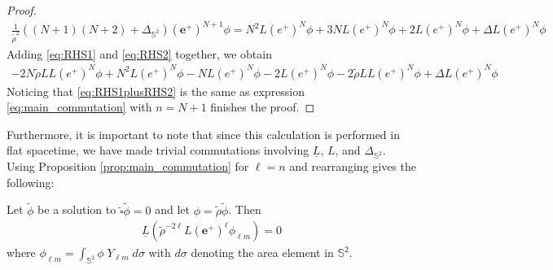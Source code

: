 \begin{proof}
\begin{align}\label{eq:RHS2}
  \frac{1}{\tilde{\rho}^2}((N+1)(N+2) + \Delta_{\mathbb{S}^2})(\boldsymbol{e}^+)^{N+1} \phi = N^{2} L\left(e^{+}\right)^{N} \phi+3 N L\left(e^{+}\right)^{N} \phi+2 L\left(e^{+}\right)^{N} \phi+\Delta L\left(e^{+}\right)^{N} \phi
\end{align}
Adding \eqref{eq:RHS1} and \eqref{eq:RHS2} together, we obtain
\begin{align}\label{eq:RHS1plusRHS2}
  -2 N \tilde{\rho} L L\left(e^{+}\right)^{N} \phi+N^{2} L\left(e^{+}\right)^{N} \phi-N L\left(e^{+}\right)^{N} \phi-2 L\left(e^{+}\right)^{N} \phi - 2 \tilde{\rho} L L\left(e^{+}\right)^{N} \phi+\Delta L\left(e^{+}\right)^{N} \phi
\end{align}
Noticing that \eqref{eq:RHS1plusRHS2} is the same as expression \eqref{eq:main_commutation} with $n = N + 1$ finishes the proof.
\end{proof}
Furthermore, it is important to note that since this calculation is performed in flat spacetime, we have made trivial commutations involving $\underline{L}$, $L$, and $\Delta_{\mathbb{S}^2}$.
Using Proposition \ref{prop:main_commutation} for $\ell=n$ and rearranging gives the following:
\pagebreak
\begin{corollary}\label{coro:main_commutation}
  Let $\tilde{\phi}$ be a solution to
  $\tilde{\square}\tilde{\phi}=0$ and let $\phi =
  \tilde{\rho}\tilde{\phi}$. Then
  \begin{align}\label{eq:coromain_commutation}
  \underline{L} (\tilde{\rho}^{-2\ell} L (\boldsymbol{e}^{+})^{\ell}\phi_{\ell m}) = 0
  \end{align}
  where $\phi_{\ell m}= \int_{\mathbb{S}^2} \phi \; Y_{\ell m} \;
  d\sigma$ with $d\sigma$ denoting the area element in
  $\mathbb{S}^2$.
\end{corollary}
